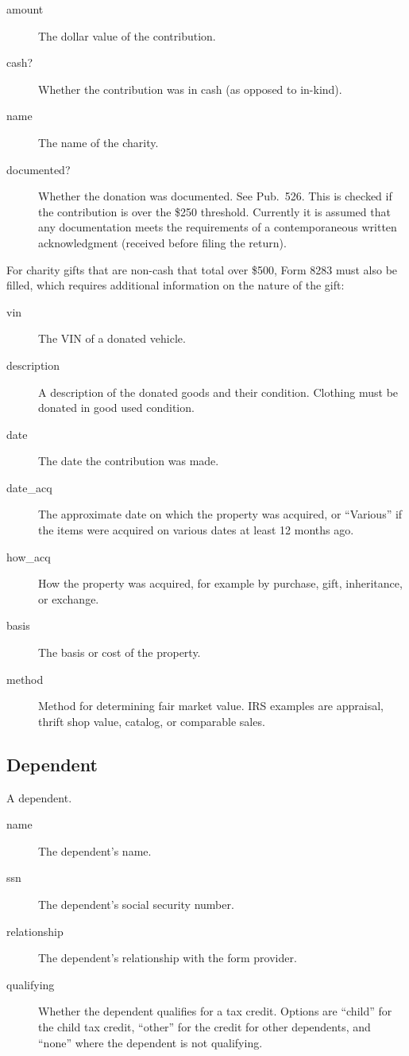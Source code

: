 \begin{description}
\item[amount] The dollar value of the contribution.
\item[cash?] Whether the contribution was in cash (as opposed to in-kind).
\item[name] The name of the charity.
\item[documented?] Whether the donation was documented. See Pub.\ 526. This is
checked if the contribution is over the \$250 threshold. Currently it is assumed
that any documentation meets the requirements of a contemporaneous written
acknowledgment (received before filing the return).
\end{description}
For charity gifts that are non-cash that total over \$500, Form 8283 must also
be filled, which requires additional information on the nature of the gift:
\begin{description}
\item[vin] The VIN of a donated vehicle.
\item[description] A description of the donated goods and their condition.
Clothing must be donated in good used condition.
\item[date] The date the contribution was made.
\item[date\_acq] The approximate date on which the property was acquired, or
``Various'' if the items were acquired on various dates at least 12 months ago.
\item[how\_acq] How the property was acquired, for example by purchase, gift,
inheritance, or exchange.
\item[basis] The basis or cost of the property.
\item[method] Method for determining fair market value. IRS examples are
appraisal, thrift shop value, catalog, or comparable sales.
\end{description}


\subsection{Dependent}

A dependent.

\begin{description}
\item[name] The dependent's name.
\item[ssn] The dependent's social security number.
\item[relationship] The dependent's relationship with the form provider.
\item[qualifying] Whether the dependent qualifies for a tax credit. Options are
``child'' for the child tax credit, ``other'' for the credit for other
dependents, and ``none'' where the dependent is not qualifying.
\end{description}


